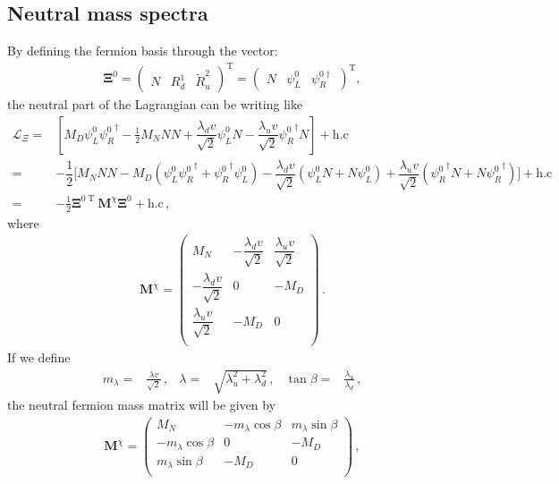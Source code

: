 \subsection{Neutral mass spectra}
%
By defining the fermion basis through the vector:
\begin{align}
\label{eq:vecgauge}
\boldsymbol{\Xi}^{0}=
\begin{pmatrix}
N & R_d^1 & \widetilde{R}_u^2   
\end{pmatrix}^{\operatorname{T}}=
\begin{pmatrix}
N & \psi_L^0 & \psi_R^{0\dagger}
\end{pmatrix}^{\operatorname{T}},
\end{align} 
the neutral part of the Lagrangian can be writing like
\begin{align}
\label{eq:neutral_lagrangian}
\mathcal{L}_{\Xi}
=& \left[ M_D\psi_L^0{\psi_{R}^0 }^{\dagger}-\tfrac{1}{2}M_N NN
+\dfrac{\lambda_d v}{\sqrt{2}}\psi_L^0N 
- \dfrac{\lambda_u v}{\sqrt{2}} {\psi_R^0}^{\dagger}N\right] +\text{h.c}\nonumber\\
=&-\dfrac{1}{2}\bigg[M_N NN - M_D(\psi_L^0{\psi_{R}^0 }^{\dagger}+{\psi_{R}^0 }^{\dagger}\psi_L^0)
-\dfrac{\lambda_d v}{\sqrt{2}}(\psi_L^0N+N\psi_L^0) 
+\dfrac{\lambda_u v}{\sqrt{2}} ({\psi_R^0}^{\dagger}N+N{\psi_R^0}^{\dagger})\bigg] +\text{h.c}
\nonumber\\
  =&-\frac{1}{2}
\boldsymbol{\Xi}^{0\operatorname{T}}
\mathbf{M}^{\chi}\boldsymbol{\Xi}^0
+\text{h.c}\,,
\end{align}
where
\begin{align}
\label{eq:Mchi}
  \mathbf{M}^{\chi}=\begin{pmatrix}
  M_N                 &-\dfrac{\lambda_d v}{\sqrt{2}}&\dfrac{\lambda_u v}{\sqrt{2}}\\
-\dfrac{\lambda_d v}{\sqrt{2}} &  0                  & -M_D\\
\dfrac{\lambda_u v}{\sqrt{2}}&  -M_D                &  0  \\
\end{pmatrix}\,.
\end{align} 
If we define
\begin{align}
  \label{eq:etabeta}
m_{\lambda}=&  \frac{\lambda v }{\sqrt{2}}\,,&
  \lambda=&\sqrt{\lambda_u^2+\lambda_d^2}\,,&
  \tan\beta=&\frac{\lambda_u}{\lambda_d}\, ,
\end{align}
the neutral fermion mass matrix will be given by
\begin{align}
\label{eq:Mchi}
  \mathbf{M}^{\chi}=\begin{pmatrix}
 M_N                 &-m_{\lambda}\cos\beta&m_{\lambda}\sin\beta\\
-m_{\lambda}\cos\beta &  0                  & -M_D\\
m_{\lambda}\sin\beta&  -M_D                &  0  \\
\end{pmatrix}\,,
\end{align}
